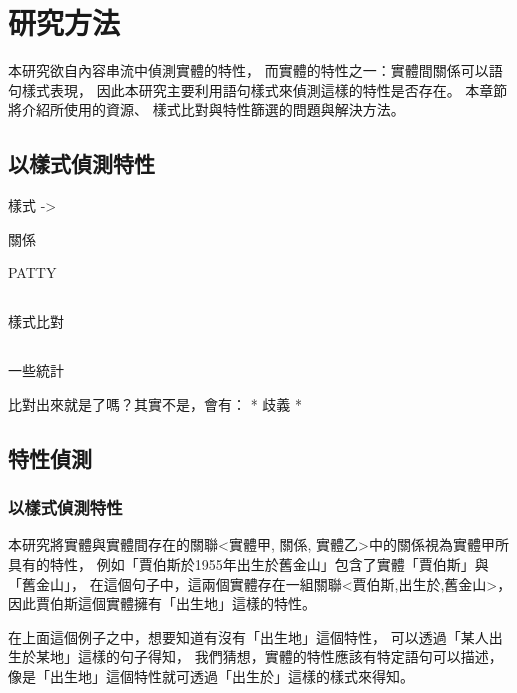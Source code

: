 %
%
%
\chapter{研究方法}
\label{c:method}

本研究欲自內容串流中偵測實體的特性，
而實體的特性之一：實體間關係可以語句樣式表現，
因此本研究主要利用語句樣式來偵測這樣的特性是否存在。
本章節將介紹所使用的資源、
樣式比對與特性篩選的問題與解決方法。

\section{以樣式偵測特性}

樣式 -> 

關係

PATTY

\section{}

樣式比對

\section{}

一些統計

比對出來就是了嗎？其實不是，會有：
* 歧義
* 

%
%
%
%


\section{特性偵測}
\subsection{以樣式偵測特性}
本研究將實體與實體間存在的關聯<實體甲, 關係, 實體乙>中的關係視為實體甲所具有的特性，
例如「賈伯斯於1955年出生於舊金山」包含了實體「賈伯斯」與「舊金山」，
在這個句子中，這兩個實體存在一組關聯<賈伯斯,出生於,舊金山>，
因此賈伯斯這個實體擁有「出生地」這樣的特性。

在上面這個例子之中，想要知道有沒有「出生地」這個特性，
可以透過「某人出生於某地」這樣的句子得知，
我們猜想，實體的特性應該有特定語句可以描述，
像是「出生地」這個特性就可透過「出生於」這樣的樣式來得知。


